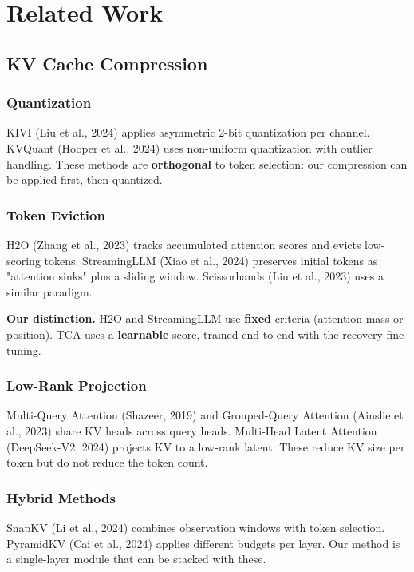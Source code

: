 \section{Related Work}

\subsection{KV Cache Compression}

\subsubsection{Quantization}

KIVI (Liu et al., 2024) applies asymmetric 2-bit quantization per channel. 
KVQuant (Hooper et al., 2024) uses non-uniform quantization with outlier 
handling. These methods are \textbf{orthogonal} to token selection: our 
compression can be applied first, then quantized.

\subsubsection{Token Eviction}

H2O (Zhang et al., 2023) tracks accumulated attention scores and evicts 
low-scoring tokens. StreamingLLM (Xiao et al., 2024) preserves initial 
tokens as "attention sinks" plus a sliding window. Scissorhands (Liu et al., 
2023) uses a similar paradigm.

\textbf{Our distinction.} H2O and StreamingLLM use \textbf{fixed} criteria (attention 
mass or position). TCA uses a \textbf{learnable} score, trained end-to-end with 
the recovery fine-tuning.

\subsubsection{Low-Rank Projection}

Multi-Query Attention (Shazeer, 2019) and Grouped-Query Attention (Ainslie 
et al., 2023) share KV heads across query heads. Multi-Head Latent Attention 
(DeepSeek-V2, 2024) projects KV to a low-rank latent. These reduce KV size 
per token but do not reduce the token count.

\subsubsection{Hybrid Methods}

SnapKV (Li et al., 2024) combines observation windows with token selection. 
PyramidKV (Cai et al., 2024) applies different budgets per layer. Our method 
is a single-layer module that can be stacked with these.

